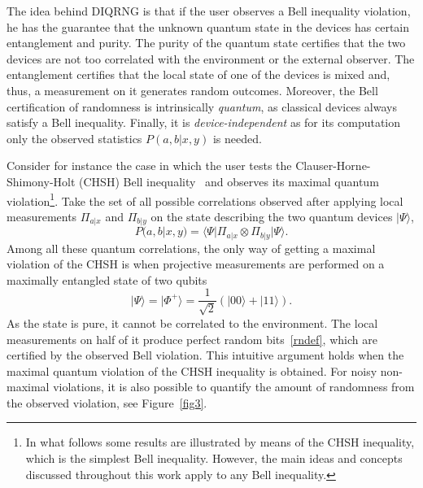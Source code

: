 \documentclass[11pt,a4paper]{article}
\newcommand{\ket}[1]{| #1 \rangle}
\newcommand{\bra}[1]{\langle #1 |}
\begin{document}
The idea behind DIQRNG is that if the user observes a Bell
inequality violation, he has the guarantee that the unknown
quantum state in the devices has certain entanglement and purity.
The purity of the
quantum state certifies that the two devices are not too
correlated with the environment or the external
observer. The entanglement certifies that the local state of
one of the devices is mixed and, thus, a measurement on it
generates random outcomes. Moreover, the Bell
certification of randomness is intrinsically \emph{quantum}, as
classical devices always satisfy a Bell inequality. Finally, it is
\emph{device-independent} as for its computation only the observed
statistics $P(a,b|x,y)$ is needed.


Consider for instance the case in which
the user tests the Clauser-Horne-Shimony-Holt (CHSH) Bell
inequality~\cite{CHSH} and observes its maximal quantum violation\footnote{In what follows some results are illustrated by means of the CHSH inequality, which is the simplest Bell inequality. However, the main ideas and concepts discussed throughout this work apply to any Bell inequality.}.
Take the set of all possible correlations observed after applying local measurements $\Pi_{a|x}$ and $\Pi_{b|y}$ on the state describing the two quantum devices $\ket{\Psi}$,
\begin{equation}
\label{qcorr}
P(a,b|x,y)=\bra{\Psi}\Pi_{a|x}\otimes\Pi_{b|y}\ket{\Psi} .
\end{equation}
Among all these quantum correlations, the only way of getting a maximal violation of the CHSH is when
projective measurements are performed on a maximally entangled state
of two qubits~\cite{Tsirelson,Tsirelson2,PR}
\begin{equation}\label{singlet}
    \ket{\Psi}=\ket{\Phi^+}=\frac{1}{\sqrt 2}(\ket{00}+\ket{11}) .
\end{equation}
As the state is pure, it cannot be correlated to the environment.
The local measurements on half of it produce perfect random
bits~\eqref{rndef}, which are certified by the observed Bell violation. This intuitive argument holds when the maximal quantum violation of the CHSH inequality is obtained. For noisy non-maximal violations, it is also possible to quantify the amount of randomness from the observed violation, see Figure~\ref{fig3}.
\end{document}
